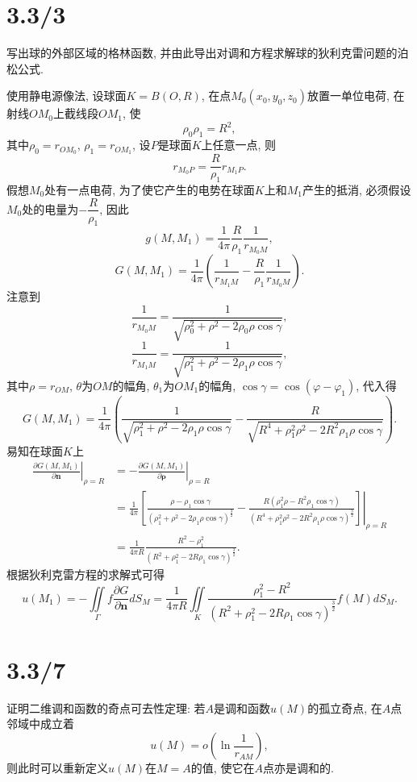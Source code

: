 \documentclass[11pt,a4paper]{article}
\begin{document}
\section{3.3/3}
\begin{problem}
写出球的外部区域的格林函数, 并由此导出对调和方程求解球的狄利克雷问题的泊松公式.
\end{problem}
使用静电源像法, 设球面$K=B(O,R)$, 在点$M_0(x_0,y_0,z_0)$放置一单位电荷, 在射线$OM_0$上截线段$OM_1$, 使$$\rho_0\rho_1=R^2,$$ 其中$\rho_0=r_{OM_0}$, $\rho_1=r_{OM_1}$, 设$P$是球面$K$上任意一点, 则
$$r_{M_0P}=\frac{R}{\rho_1}r_{M_1P}.$$
假想$M_0$处有一点电荷, 为了使它产生的电势在球面$K$上和$M_1$产生的抵消, 必须假设$M_0$处的电量为$-\dfrac{R}{\rho_1}$, 因此
$$g(M,M_1)=\frac{1}{4\pi}\frac{R}{\rho_1}\frac{1}{r_{M_0M}},$$
$$G(M,M_1)=\frac{1}{4\pi}\left(\frac{1}{r_{M_1M}}-
  \frac{R}{\rho_1}\frac{1}{r_{M_0M}}\right).$$
注意到
$$\frac{1}{r_{M_0M}}=\frac{1}{\sqrt{\rho_0^2+\rho^2-2\rho_0\rho\cos\gamma}},$$
$$\frac{1}{r_{M_1M}}=\frac{1}{\sqrt{\rho_1^2+\rho^2-2\rho_1\rho\cos\gamma}},$$
其中$\rho=r_{OM}$, $\theta$为$OM$的幅角, $\theta_1$为$OM_1$的幅角, $\cos\gamma=\cos(\varphi-\varphi_1)$, 代入得
$$G(M,M_1)=\frac{1}{4\pi}\left(\frac{1}{\sqrt{\rho_1^2+\rho^2-2\rho_1\rho\cos\gamma}}-\frac{R}{\sqrt{R^4+\rho_1^2\rho^2-2R^2\rho_1\rho\cos\gamma}}\right).$$
易知在球面$K$上
\begin{align*}
  \left.\frac{\partial G(M,M_1)}{\partial\mathbf{n}}\right|_{\rho=R}
   & =-\left.\frac{\partial G(M,M_1)}{\partial\pmb{\rho}}\right|_{\rho=R}                                                           \\
   & =\left.\frac{1}{4\pi}\left[\frac{\rho-\rho_1\cos\gamma}{(\rho_1^2+\rho^2-2\rho_1\rho\cos\gamma)^{\frac{3}{2}}}
    -\frac{R(\rho_1^2\rho-R^2\rho_1\cos\gamma)}{(R^4+\rho_1^2\rho^2-2R^2\rho_1\rho\cos\gamma)^{\frac{3}{2}}}\right]\right|_{\rho=R} \\
   & =\frac{1}{4\pi R}\frac{R^2-\rho_1^2}{(R^2+\rho_1^2-2R\rho_1\cos\gamma)^{\frac{3}{2}}}.
\end{align*}
根据狄利克雷方程的求解式可得
$$u(M_1)=-\iint\limits_{\Gamma}f\frac{\partial G}{\partial\mathbf{n}}dS_M=\frac{1}{4\pi R}\iint\limits_K\frac{\rho_1^2-R^2}{(R^2+\rho_1^2-2R\rho_1\cos\gamma)^{\frac{3}{2}}}f(M)dS_M.$$

\section{3.3/7}
\begin{problem}
证明二维调和函数的奇点可去性定理: 若$A$是调和函数$u(M)$的孤立奇点, 在$A$点邻域中成立着
$$u(M)=o\left(\ln\frac{1}{r_{AM}}\right),$$
则此时可以重新定义$u(M)$在$M=A$的值, 使它在$A$点亦是调和的.
\end{problem}
\end{document}
